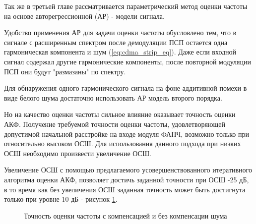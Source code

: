 Так же в третьей главе рассматривается параметрический метод оценки частоты на основе авторегрессионной (АР) - модели сигнала.

Удобство применения АР для задачи оценки частоты обусловлено тем, что в сигнале с расширенным спектром после демодуляции ПСП остается одна
гармоническая компонента и шум (\ref{eq:cdma_strip_eq}).  Даже если входной сигнал содержал другие гармонические компоненты,
после повторной модуляции ПСП они будут "размазаны" по спектру.

Для обнаружения одного гармонического сигнала на фоне аддитивной помехи в виде белого шума достаточно использовать АР модель второго порядка.

Но на качество оценки частоты сильное влияние оказывает точность оценки АКФ. Получение требуемой точности оценки частоты, удовлетворяющей допустимой начальной
расстройке на входе модуля ФАПЧ, возможно только при относительно высоком ОСШ. Для использования данного подхода при низких ОСШ необходимо произвести
увеличение ОСШ.

Увеличение ОСШ с помощью предлагаемого усовершенствованного итеративного алгоритма оценки АКФ, позволяет достичь заданной точности при ОСШ -25 дБ, в то
время как без увеличения ОСШ заданная точность может быть достигнута только при уровне 10 дБ - рисунок \ref{pic:ACF_boost}.

\begin{figure}[H]
\center{}
	\caption{Точность оценки частоты с компенсацией и без компенсации шума}
	\label{pic:ACF_boost}
\end{figure}
